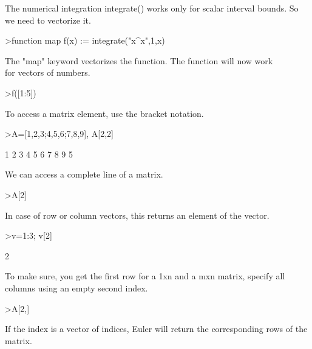 \documentclass{article}
\begin{document}
\begin{eulernotebook}
\begin{eulercomment}
\begin{eulercomment}
\begin{eulercomment}
\begin{eulercomment}
\begin{eulercomment}
\begin{eulercomment}
\begin{eulercomment}
The numerical integration integrate() works only for scalar interval bounds.
So we need to vectorize it.
\end{eulercomment}
\begin{eulerprompt}
>function map f(x) := integrate("x^x",1,x)
\end{eulerprompt}
\begin{eulercomment}
The "map" keyword vectorizes the function. The function will now work\\
for vectors of numbers.
\end{eulercomment}
\begin{eulerprompt}
>f([1:5])
\end{eulerprompt}
\begin{euleroutput}
  [0,  2.05045,  13.7251,  113.336,  1241.03]
\end{euleroutput}
\begin{eulercomment}
To access a matrix element, use the bracket notation.
\end{eulercomment}
\begin{eulerprompt}
>A=[1,2,3;4,5,6;7,8,9], A[2,2]
\end{eulerprompt}
\begin{euleroutput}
              1             2             3 
              4             5             6 
              7             8             9 
  5
\end{euleroutput}
\begin{eulercomment}
We can access a complete line of a matrix.
\end{eulercomment}
\begin{eulerprompt}
>A[2]
\end{eulerprompt}
\begin{euleroutput}
  [4,  5,  6]
\end{euleroutput}
\begin{eulercomment}
In case of row or column vectors, this returns an element of the
vector.
\end{eulercomment}
\begin{eulerprompt}
>v=1:3; v[2]
\end{eulerprompt}
\begin{euleroutput}
  2
\end{euleroutput}
\begin{eulercomment}
To make sure, you get the first row for a 1xn and a mxn matrix,
specify all columns using an empty second index.
\end{eulercomment}
\begin{eulerprompt}
>A[2,]
\end{eulerprompt}
\begin{euleroutput}
  [4,  5,  6]
\end{euleroutput}
\begin{eulercomment}
If the index is a vector of indices, Euler will return the
corresponding rows of the matrix.


\end{eulercomment}
\end{eulercomment}
\end{eulercomment}
\end{eulercomment}
\end{eulercomment}
\end{eulercomment}
\end{eulercomment}
\end{eulernotebook}
\end{document}
